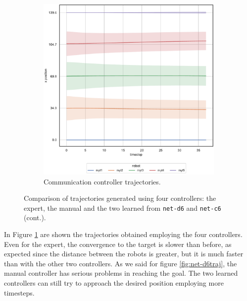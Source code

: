\begin{figure}[!htb]
\begin{center}
\begin{subfigure}[h]{0.49\textwidth}
			\includegraphics[width=\textwidth]{contents/images/net-c6/position-overtime-learned_communication}
			\caption{Communication controller trajectories.}
		\end{subfigure}
	\end{center}
	\vspace{-0.5cm}
	\caption[]{Comparison of trajectories generated using four controllers: the 
	expert, the manual and the two learned from \texttt{net-d6} and 
	\texttt{net-c6} (cont.).}
	\label{fig:net-c6traj}
\end{figure}
In Figure \ref{fig:net-c6traj} are shown the trajectories obtained employing the 
four controllers. Even for the expert, the convergence to the target is slower than 
before, as expected since the distance between the robots is greater, but it is 
much faster than with the other two controllers. As we said for figure 
\ref{fig:net-d6traj}, the manual controller has serious problems in reaching the 
goal. The two learned controllers can still try to approach the desired position 
employing more timesteps.

